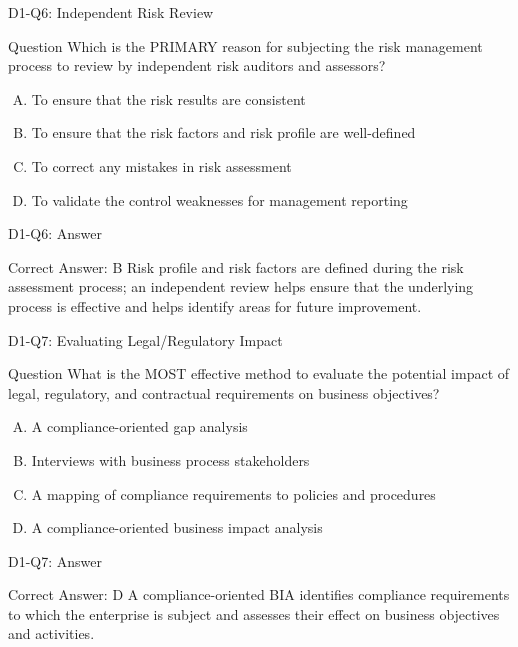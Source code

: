 \documentclass{beamer}
\begin{document}
	\begin{frame}{D1-Q6: Independent Risk Review}
		\begin{block}{Question}
			Which is the PRIMARY reason for subjecting the risk management process to review by independent risk auditors and assessors?
		\end{block}
		\begin{enumerate}[(A)]
			\item To ensure that the risk results are consistent
			\item To ensure that the risk factors and risk profile are well-defined
			\item To correct any mistakes in risk assessment
			\item To validate the control weaknesses for management reporting
		\end{enumerate}
	\end{frame}
	\begin{frame}{D1-Q6: Answer}
		\begin{block}{Correct Answer: B}
			Risk profile and risk factors are defined during the risk assessment process; an independent review helps ensure that the underlying process is effective and helps identify areas for future improvement.
		\end{block}
	\end{frame}
	
	\begin{frame}{D1-Q7: Evaluating Legal/Regulatory Impact}
		\begin{block}{Question}
			What is the MOST effective method to evaluate the potential impact of legal, regulatory, and contractual requirements on business objectives?
		\end{block}
		\begin{enumerate}[(A)]
			\item A compliance-oriented gap analysis
			\item Interviews with business process stakeholders
			\item A mapping of compliance requirements to policies and procedures
			\item A compliance-oriented business impact analysis
		\end{enumerate}
	\end{frame}
	\begin{frame}{D1-Q7: Answer}
		\begin{block}{Correct Answer: D}
			A compliance-oriented BIA identifies compliance requirements to which the enterprise is subject and assesses their effect on business objectives and activities.
		\end{block}
	\end{frame}
	
\end{document}
